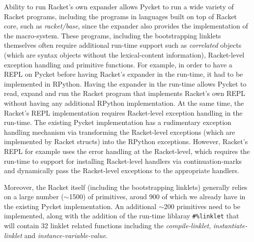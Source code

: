 Ability to run Racket's own expander allows Pycket to run a wide
variety of Racket programs, including the programs in languages built
on top of Racket core, such as \emph{racket/base}, since the expander
also provides the implementation of the macro-system. These programs,
including the bootstrapping linklets themselves often require
additional run-time support such as \emph{correlated} objects (which
are syntax objects without the lexical-content information),
Racket-level exception handling and primitive functions. For example,
in order to have a REPL on Pycket before having Racket's expander in
the run-time, it had to be implemented in RPython. Having the expander
in the run-time allows Pycket to read, expand and run the Racket
program that implements Racket's own REPL without having any
additional RPython implementation. At the same time, the Racket's REPL
implementation requires Racket-level exception handling in the
run-time. The existing Pycket implementation has a rudimentary
exception handling mechanism via transforming the Racket-level
exceptions (which are implemented by Racket structs) into the RPython
exceptions. However, Racket's REPL for example uses the error handling
at the Racket-level, which requires the run-time to support for
installing Racket-level handlers via continuation-marks and
dynamically pass the Racket-level exceptions to the appropriate
handlers.

Moreover, the Racket itself (including the bootstrapping linklets)
generally relies on a large number ($\sim$1500) of primitives, aroud 900
of which we already have in the existing Pycket implementation. An
additional $\sim$200 primitives need to be implemented, along with the
addition of the run-time liblaray \texttt{\#\%linklet} that will
contain 32 linklet related functions including the
\emph{compile-linklet}, \emph{instantiate-linklet} and
\emph{instance-variable-value}.
